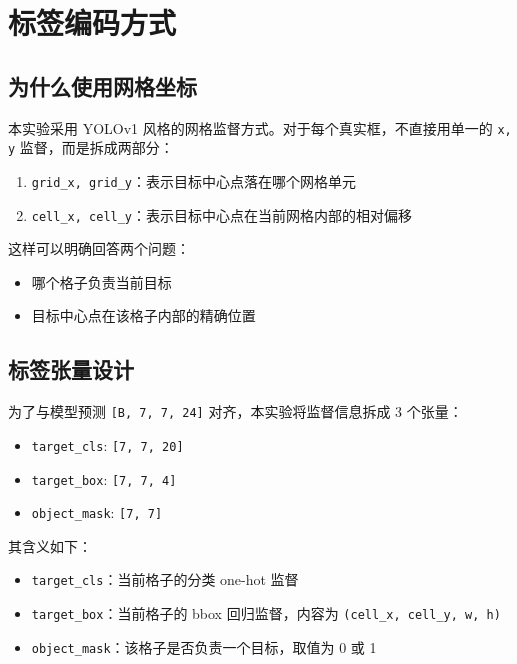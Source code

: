 \documentclass[11pt,a4paper]{article}
\begin{document}
\section{标签编码方式}

\subsection{为什么使用网格坐标}

本实验采用 YOLOv1 风格的网格监督方式。对于每个真实框，不直接用单一的 \texttt{x, y} 监督，而是拆成两部分：

\begin{enumerate}
  \item \texttt{grid\_x, grid\_y}：表示目标中心点落在哪个网格单元
  \item \texttt{cell\_x, cell\_y}：表示目标中心点在当前网格内部的相对偏移
\end{enumerate}

这样可以明确回答两个问题：

\begin{itemize}
  \item 哪个格子负责当前目标
  \item 目标中心点在该格子内部的精确位置
\end{itemize}

\subsection{标签张量设计}

为了与模型预测 \texttt{[B, 7, 7, 24]} 对齐，本实验将监督信息拆成 3 个张量：

\begin{itemize}
  \item \texttt{target\_cls}: \texttt{[7, 7, 20]}
  \item \texttt{target\_box}: \texttt{[7, 7, 4]}
  \item \texttt{object\_mask}: \texttt{[7, 7]}
\end{itemize}

其含义如下：

\begin{itemize}
  \item \texttt{target\_cls}：当前格子的分类 one-hot 监督
  \item \texttt{target\_box}：当前格子的 bbox 回归监督，内容为 \texttt{(cell\_x, cell\_y, w, h)}
  \item \texttt{object\_mask}：该格子是否负责一个目标，取值为 0 或 1
\end{itemize}
\end{document}
